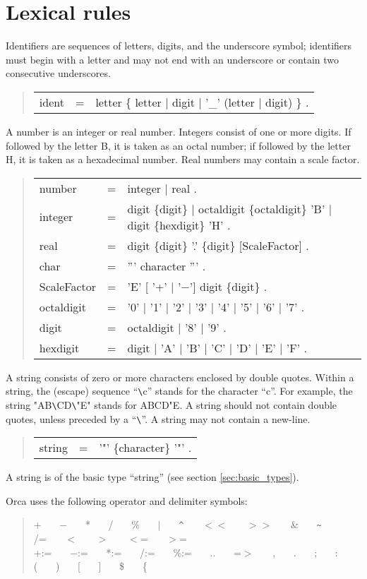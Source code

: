 \documentclass[10pt]{article}
\newenvironment{grammar}
{\begin{quote} \begin{tabular}{p{3.8cm} l l}}
{\end{tabular}\end{quote}}
\begin{document}
\section{Lexical rules}
Identifiers are sequences of letters, digits, and the underscore symbol;
identifiers must begin with a letter and may not end with an underscore
or contain two consecutive underscores.

\begin{grammar}
ident & = & letter \{ letter $|$ digit $|$ '\_' (letter $|$ digit) \} .
\end{grammar}

A number is an integer or real number.
Integers consist of one or more digits.
If followed by the letter B, it is taken as an octal number;
if followed by the letter H, it is taken as a hexadecimal number.
Real numbers may contain a scale factor.
\begin{grammar}
number & = & integer $|$ real . \\
integer & = & digit \{digit\} $|$ octaldigit \{octaldigit\} 'B' $|$ digit \{hexdigit\} 'H' . \\
real & = & digit \{digit\} '.' \{digit\} [ScaleFactor] . \\
char & = & ''' character ''' . \\
ScaleFactor & = & 'E' [ '+' $|$ '$-$'] digit \{digit\} . \\
octaldigit & = & '0' $|$ '1' $|$ '2' $|$ '3' $|$ '4' $|$ '5' $|$ '6' $|$ '7' . \\
digit & = & octaldigit $|$ '8' $|$ '9' . \\
hexdigit & = & digit $|$ 'A' $|$ 'B' $|$ 'C' $|$ 'D' $|$ 'E' $|$ 'F' .
\end{grammar}

A string consists of zero or more characters enclosed by double quotes.
Within a string, the (escape) sequence ``\verb+\+c'' stands for the character ``c''.
For example, the string "AB\verb+\+CD\verb+\+"E" stands for ABCD"E.
A string should not contain double quotes, unless preceded by a ``\verb+\+''.
A string may not contain a new-line.
\begin{grammar}
string & = & '"' \{character\} '"' .
\end{grammar}
A string is of the basic type ``string'' (see section \ref{sec:basic_types}).

Orca uses the following operator and delimiter symbols:
\begin{quote}
+~~~
$-$~~~
*~~~
/~~~
\%~~~
$|$~~~
\verb+^+~~~
$<<$~~~
$>>$~~~
\&~~~
\verb+~+~~~
/=~~~
$<$~~~
$>$~~~
$<$=~~~
$>$= \\
+:=~~~
$-$:=~~~
*:=~~~
/:=~~~
\%:=~~~
..~~~
=$>$~~~
,~~~
.~~~
;~~~
:~~~
(~~~
)~~~
[~~~
]~~~
\$~~~
\{~~~
\end{quote}
\end{document}
